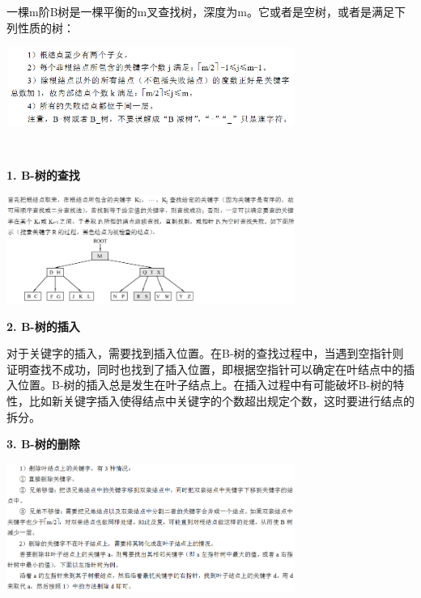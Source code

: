 {一棵m阶B树是一棵平衡的m叉查找树，深度为m。它或者是空树，或者是满足下列性质的树：}

\includegraphics[width=3.70833in,height=1.01042in]{png-jpeg-pics/8B9FFB1654B52E5281DEEC31E5542D98.png}

{\\
}

{\textbf{1. B-树的查找}}

\includegraphics[width=3.70833in,height=1.39583in]{png-jpeg-pics/C68BFA227408F8456869E5A3ECA063AA.png}

{}

{ }

{\textbf{2. B-树的插入}}

{对于关键字的插入，需要找到插入位置。在B-树的查找过程中，当遇到空指针则证明查找不成功，同时也找到了插入位置，即根据空指针可以确定在叶结点中的插入位置。B-树的插入总是发生在叶子结点上。在插入过程中有可能破坏B-树的特性，比如新关键字插入使得结点中关键字的个数超出规定个数，这时要进行结点的拆分。}

{\textbf{3. B-树的删除}}

{\textbf{\includegraphics[width=3.70833in,height=1.64583in]{png-jpeg-pics/61618BE80845AD4A7A536F8ADE89229F.png}\\
}}
